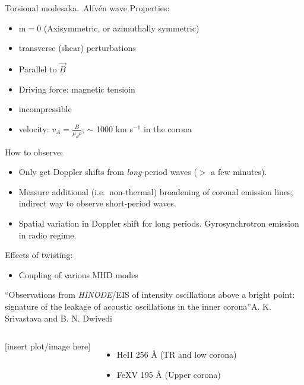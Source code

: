 \documentclass[table]{beamer}
\begin{document}
\begin{frame}{Torsional modes}{aka.\ Alfv\'en wave}
    Properties:
    \begin{itemize}
        \item m$=$0 (Axisymmetric, or azimuthally symmetric)
        \item transverse (shear) perturbations
        \item Parallel to $\vec{B}$
        \item Driving force: magnetic tensioin
        \item incompressible
        \item velocity: $v_{A} = \frac{B}{\mu_{o}\rho}$;
            $\sim$ 1000 km s$^{-1}$ in the corona
    \end{itemize}
    How to observe:
    \begin{itemize}
        \item Only get Doppler shifts from \emph{long}-period waves
            ($>$ a few minutes).
        \item Measure additional (i.e.\ non-thermal) broadening
            of coronal emission lines; indirect way to observe short-period waves.
        \item Spatial variation in Doppler shift for long periods.
            Gyrosynchrotron emission in radio regime.
    \end{itemize}
    Effects of twisting:
    \begin{itemize}
        \item Coupling of various MHD modes
    \end{itemize}
\end{frame}%
\begin{frame}{``Observations from \emph{HINODE}/EIS of intensity oscillations
        above a bright point\@: signature of the leakage of acoustic
    oscillations in the inner corona''}{A. K. Srivastava and B. N. Dwivedi}
    \begin{columns}
        \column{0.5\paperwidth}
        [insert plot/image here]
        \column{0.5\paperwidth}
        \begin{itemize}
            \item He{\footnotesize II} 256 \AA{} (TR and low corona)
            \item Fe{\footnotesize XV} 195 \AA{} (Upper corona)
        \end{itemize}
    \end{columns}
\end{frame}%
\end{document}
